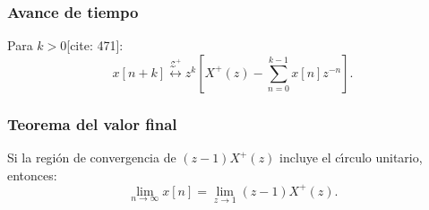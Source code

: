 \subsubsection{Avance de tiempo}
Para $k > 0$[cite: 471]:
\begin{equation}
	x[n+k] \stackrel{\mathcal{Z}^+}{\longleftrightarrow} z^{k} \left[ X^{+}(z) - \sum_{n=0}^{k-1} x[n] z^{-n} \right].
\end{equation}

\subsubsection{Teorema del valor final}
Si la regi\'{o}n de convergencia de $(z-1) X^{+}(z)$ incluye el c\'{\i}rculo unitario, entonces:
\begin{equation}
	\lim_{n \to \infty} x[n] = \lim_{z \to 1} (z - 1) X^{+}(z).
\end{equation}

